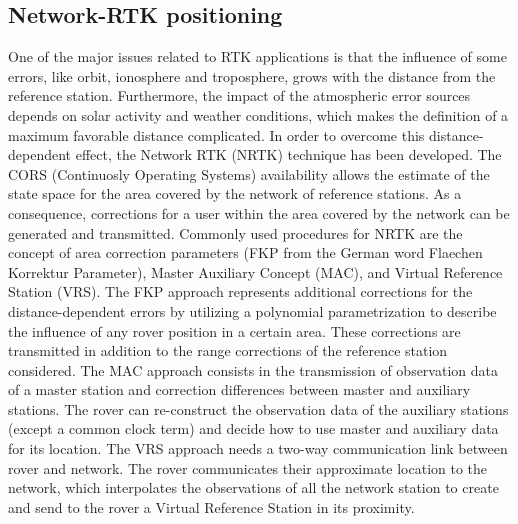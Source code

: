 \subsection{Network-RTK positioning}

One of the major issues related to RTK applications is that the influence of some errors, like
orbit, ionosphere and troposphere, grows with the distance from the reference station. Furthermore,
the impact of the atmospheric error sources depends on solar activity and weather
conditions, which makes the definition of a maximum favorable distance complicated. In order
to overcome this distance-dependent effect, the Network RTK (NRTK) technique has been
developed. The CORS (Continuosly Operating Systems) availability allows the estimate of the state space for the area covered by
the network of reference stations. As a consequence, corrections for a user within the area covered
by the network can be generated and transmitted. Commonly used procedures for NRTK
are the concept of area correction parameters (FKP from the German word Flaechen Korrektur
Parameter), Master Auxiliary Concept (MAC), and Virtual Reference Station (VRS). 
The FKP approach represents additional corrections for the distance-dependent errors by
utilizing a polynomial parametrization to describe the influence of any rover position in a certain
area. These corrections are transmitted in addition to the range corrections of the reference
station considered.
The MAC approach consists in the transmission of observation data of a master station
and correction differences between master and auxiliary stations. The rover can re-construct
the observation data of the auxiliary stations (except a common clock term) and decide how
to use master and auxiliary data for its location.
The VRS approach needs a two-way communication link between rover and network. The
rover communicates their approximate location to the network, which interpolates the observations of all the network station to create and send to the rover a Virtual Reference Station in its proximity. 
